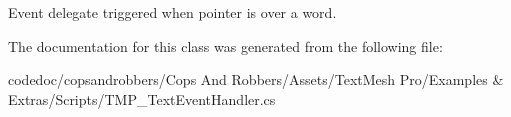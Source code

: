 Event delegate triggered when pointer is over a word. 



The documentation for this class was generated from the following file\+:\begin{DoxyCompactItemize}
\item 
codedoc/copsandrobbers/\+Cops And Robbers/\+Assets/\+Text\+Mesh Pro/\+Examples \& Extras/\+Scripts/T\+M\+P\+\_\+\+Text\+Event\+Handler.\+cs\end{DoxyCompactItemize}
